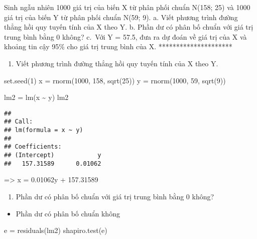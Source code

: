 \documentclass[
]{article}
\newenvironment{Shaded}{\begin{snugshade}}{\end{snugshade}}
\newcommand{\DecValTok}[1]{\textcolor[rgb]{0.00,0.00,0.81}{#1}}
\newcommand{\FunctionTok}[1]{\textcolor[rgb]{0.00,0.00,0.00}{#1}}
\newcommand{\NormalTok}[1]{#1}
\newcommand{\OtherTok}[1]{\textcolor[rgb]{0.56,0.35,0.01}{#1}}
\newcommand{\SpecialCharTok}[1]{\textcolor[rgb]{0.00,0.00,0.00}{#1}}
\providecommand{\tightlist}{%
  \setlength{\itemsep}{0pt}\setlength{\parskip}{0pt}}
\begin{document}
Sinh ngẫu nhiên 1000 giá trị của biến X từ phân phối chuẩn N(158; 25) và
1000 giá trị của biến Y từ phân phối chuẩn N(59; 9). a. Viết phương
trình đường thẳng hồi quy tuyến tính của X theo Y. b. Phần dư có phân bố
chuẩn với giá trị trung bình bằng 0 không? c.~Với Y = 57.5, đưa ra dự
đoán về giá trị của X và khoảng tin cậy 95\% cho giá trị trung bình của
X. *********************

\begin{enumerate}
\def\labelenumi{\alph{enumi}.}
\tightlist
\item
  Viết phương trình đường thẳng hồi quy tuyến tính của X theo Y.
\end{enumerate}

\begin{Shaded}
\begin{Highlighting}[]
\FunctionTok{set.seed}\NormalTok{(}\DecValTok{1}\NormalTok{)}
\NormalTok{x }\OtherTok{=} \FunctionTok{rnorm}\NormalTok{(}\DecValTok{1000}\NormalTok{, }\DecValTok{158}\NormalTok{, }\FunctionTok{sqrt}\NormalTok{(}\DecValTok{25}\NormalTok{))}
\NormalTok{y }\OtherTok{=} \FunctionTok{rnorm}\NormalTok{(}\DecValTok{1000}\NormalTok{, }\DecValTok{59}\NormalTok{, }\FunctionTok{sqrt}\NormalTok{(}\DecValTok{9}\NormalTok{))}

\NormalTok{lm2 }\OtherTok{=} \FunctionTok{lm}\NormalTok{(x }\SpecialCharTok{\textasciitilde{}}\NormalTok{ y)}
\NormalTok{lm2}
\end{Highlighting}
\end{Shaded}

\begin{verbatim}
## 
## Call:
## lm(formula = x ~ y)
## 
## Coefficients:
## (Intercept)            y  
##   157.31589      0.01062
\end{verbatim}

=\textgreater{} x = 0.01062y + 157.31589

\begin{enumerate}
\def\labelenumi{\alph{enumi}.}
\setcounter{enumi}{1}
\tightlist
\item
  Phần dư có phân bố chuẩn với giá trị trung bình bằng 0 không?
\end{enumerate}

\begin{itemize}
\tightlist
\item
  Phần dư có phân bố chuẩn không
\end{itemize}

\begin{Shaded}
\begin{Highlighting}[]
\NormalTok{e }\OtherTok{=} \FunctionTok{residuals}\NormalTok{(lm2)}
\FunctionTok{shapiro.test}\NormalTok{(e)}
\end{Highlighting}
\end{Shaded}
\end{document}
